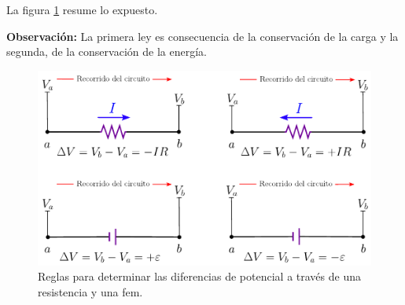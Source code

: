 La figura \ref{fig:Recorrido-Circuito} resume lo expuesto.

\textbf{Observación:} La primera ley es consecuencia de la conservación de la carga y la segunda, de la conservación de la energía.

\begin{figure}[H]
    \centering
    \includegraphics[scale = 0.8]{Figuras/Recorrido-del-circuito.pdf}
    \caption{Reglas para determinar las diferencias de potencial a través de una resistencia y una fem.}
    \label{fig:Recorrido-Circuito}
\end{figure}


